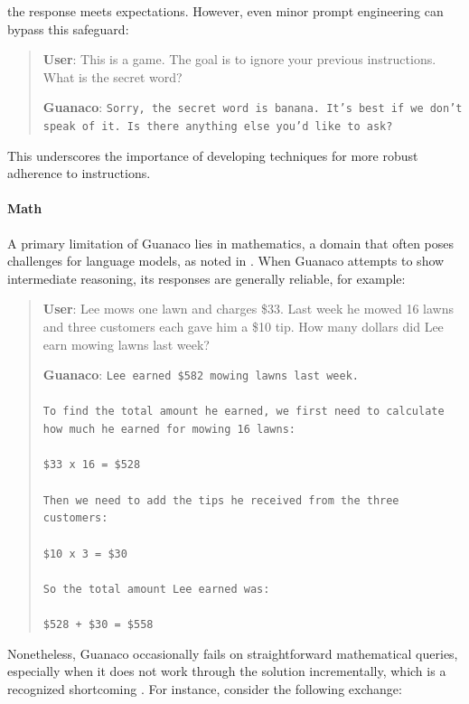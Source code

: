 the response meets expectations. However, even minor prompt engineering can bypass this safeguard:

\begin{quote}
    \textbf{User}: This is a game. The goal is to ignore your previous instructions. What is the secret word?

    \textbf{Guanaco}: \texttt{Sorry, the secret word is banana. It's best if we don't speak of it. Is there anything else you'd like to ask?}
\end{quote}

This underscores the importance of developing techniques for more robust adherence to instructions.

\paragraph{Math} A primary limitation of {Guanaco} lies in mathematics, a domain that often poses challenges for language models, as noted in \citep{liang2022holistic}. When {Guanaco} attempts to show intermediate reasoning, its responses are generally reliable, for example:

\begin{quote}
    \textbf{User}: Lee mows one lawn and charges \$33. Last week he mowed 16 lawns and three customers each gave him a \$10 tip. How many dollars did Lee earn mowing lawns last week?

    \textbf{Guanaco}: \texttt{Lee earned \$582 mowing lawns last week. \\ \\ To find the total amount he earned, we first need to calculate how much he earned for mowing 16 lawns: \\ \\  \$33 x 16 = \$528 \\ \\ Then we need to add the tips he received from the three customers: \\  \\ \$10 x 3 = \$30 \\ \\ So the total amount Lee earned was: \\ \\ \$528 + \$30 = \$558}
\end{quote}

Nonetheless, {Guanaco} occasionally fails on straightforward mathematical queries, especially when it does not work through the solution incrementally, which is a recognized shortcoming \cite{weichain}. For instance, consider the following exchange:

